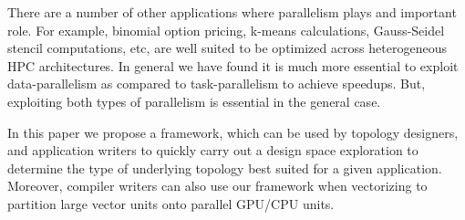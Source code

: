 There are a number of other applications where parallelism plays and
important role. For example, binomial option pricing, k-means
calculations, Gauss-Seidel stencil computations, etc, are well suited to
be optimized across heterogeneous HPC architectures. In general we have
found it is much more essential to exploit data-parallelism as compared
to task-parallelism to achieve speedups. But, exploiting both types of
parallelism is essential in the general case.

In this paper we propose a framework, which can be used by topology
designers, and application writers to quickly carry out a design space
exploration to determine the type of underlying topology best suited for
a given application. Moreover, compiler writers can also use our
framework when vectorizing to partition large vector units onto parallel
GPU/CPU units.

